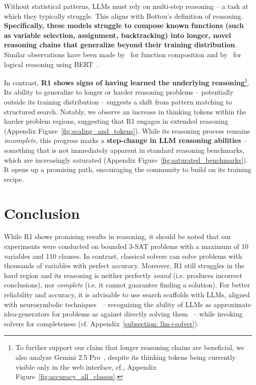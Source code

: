 \documentclass{article} %
\begin{document}
Without statistical patterns, LLMs must rely on multi-step reasoning -- a task at which they typically struggle. This aligns with Bottou's definition of reasoning. \textbf{Specifically, these models struggle to compose known functions (such as variable selection, assignment, backtracking) into longer, novel reasoning chains that generalize beyond their training distribution}. Similar observations have been made by~\citet{dziri2023faith} for function composition and by~\citet{paradox_of_learning_to_reason} for logical reasoning using BERT~\citep{bert_transformer}.

In contrast, \textbf{R1 shows signs of having learned the underlying reasoning}\footnote{To further support our claim that longer reasoning chains are beneficial, we also analyze Gemini 2.5 Pro~\citep{gemini25pro}, despite its thinking tokens being currently visible only in the web interface, cf., Appendix Figure~\ref{fig:accuracy_all_classes}.}. Its ability to generalize to longer or harder reasoning problems -- potentially outside its training distribution -- suggests a shift from pattern matching to structured search. Notably, we observe an increase in thinking tokens within the harder problem regions, suggesting that R1 engages in extended reasoning (Appendix Figure~\ref{fig:scaling_and_tokens}). While its reasoning process remains \emph{incomplete}, this progress marks a \textbf{step-change in LLM reasoning abilities} -- something that is not immediately apparent in standard reasoning benchmarks, which are increasingly saturated (Appendix Figure~\ref{fig:saturated_benchmarks}). It opens up a promising path, encouraging the community to build on its training recipe.

\section{Conclusion}
While R1 shows promising results in reasoning, it should be noted that our experiments were conducted on bounded 3-SAT problems with a maximum of 10 variables and 110 clauses. In contrast, classical solvers can solve problems with thousands of variables with perfect accuracy. Moreover, R1 still struggles in the hard region and its reasoning is neither perfectly \emph{sound} (i.e. produces incorrect conclusions), nor \emph{complete} (i.e. it cannot guarantee finding a solution). For better reliability and accuracy, it is advisable to use search scaffolds with LLMs, aligned with neurosymbolic techniques~\citep{deraedt2020statistical} -- recognizing the ability of LLMs as approximate idea-generators for problems as against directly solving them~\citep{llm_modulo_frameworks} --  while invoking solvers for completeness (cf. Appendix~\ref{subsection: llm+solver}).
\end{document}
